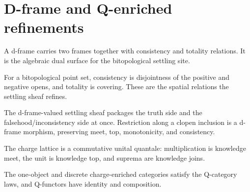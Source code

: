 \section{D-frame and Q-enriched refinements}

\begin{proposition}\label{thm:dframe-carrier}\leanok{}
A d-frame carries two frames together with consistency and totality relations.
It is the algebraic dual surface for the bitopological settling site.
\end{proposition}

\begin{theorem}\label{thm:bitopological-dframe-relations}\leanok{}
For a bitopological point set, consistency is disjointness of the positive and
negative opens, and totality is covering.  These are the spatial relations the
settling sheaf refines.
\end{theorem}

\begin{theorem}\label{thm:dframe-valued-sheaf}\leanok{}
The d-frame-valued settling sheaf packages the truth side and the
falsehood/inconsistency side at once.  Restriction along a clopen inclusion is
a d-frame morphism, preserving meet, top, monotonicity, and consistency.
\end{theorem}

\begin{proposition}\label{thm:charge-quantale}\leanok{}
The charge lattice is a commutative unital quantale: multiplication is
knowledge meet, the unit is knowledge top, and suprema are knowledge joins.
\end{proposition}

\begin{theorem}\label{thm:qcat-is-quantale-category}\leanok{}
The one-object and discrete charge-enriched categories satisfy the Q-category
laws, and Q-functors have identity and composition.
\end{theorem}

